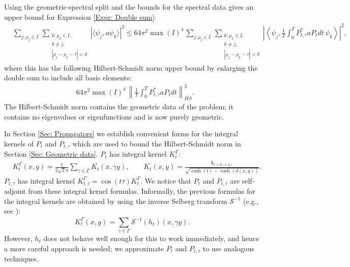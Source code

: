 \documentclass[11pt,twoside,reqno]{amsart} \usepackage{a4wide} \usepackage[T1]{fontenc} \usepackage[utf8]{inputenc} \usepackage{soul}  \usepackage{amsmath} \usepackage{amsfonts} \usepackage{amssymb} \usepackage{mathtools} \usepackage{amsthm} \usepackage{xcolor} \usepackage{graphicx} \usepackage{hyperref} \usepackage{standalone} \usepackage{esint} \usepackage{comment} \usepackage[left=2.3cm,top=3cm,right=2.3cm]{geometry} \usepackage{bm} \usepackage{svg} \usepackage{float} \numberwithin{equation}{section} \theoremstyle{plain} \newtheorem{thm}{Theorem}[section] \newtheorem{theorem}[thm]{Theorem} \newtheorem*{theorem*}{Theorem}\newtheorem{conj}[thm]{Conjecture} \newtheorem{lemma}[thm]{Lemma} \newtheorem{prop}[thm]{Proposition} \newtheorem{proposition}[thm]{Proposition} \newtheorem{cor}[thm]{Corollary} \newtheorem{question}[thm]{Question} \newtheorem{corollary}[thm]{Corollary} \newtheorem{assumption}[thm]{Assumption} \theoremstyle{definition} \newtheorem{defn}[thm]{Definition} \newtheorem{choice}[thm]{Choice} \newtheorem{definition}[thm]{Definition} \newtheorem{ex}[thm]{Example} \newtheorem{notation}[thm]{Notation} \newtheorem*{ack}{Acknowledgements} \theoremstyle{remark} \newtheorem{remark}[thm]{Remark} \newtheorem{bigremark}[thm]{Remark} \usepackage{xcolor} \newcommand{\red}[1]{ {\color{Red}#1} } \newcommand{\blue}[1]{ {\color{Blue}#1} } \author{Kai Hippi} \address{Aalto University, Espoo, Finland} \email{kai.hippi@aalto.fi}
\begin{document}
Using the geometric-spectral split and the bounds for the spectral data gives an upper bound for Expression \eqref{Expr: Double sum}:
\begin{align*}
	&
	\sum_{j: \rho_{j} \in I}^{} \, \sum_{ \substack{ k: \rho_{k} \in I, \\ k \neq j, \\ | \rho_{j} - \rho_{k} - \tau | < \delta } }^{} \left| \langle \psi_{j}, a \psi_{k} \rangle \right|^{2}
\leq
	64 \pi^{2} \max( I )^{4}  \,  \sum_{j: \rho_{j} \in I}^{} \, \sum_{ \substack{ k: \rho_{k} \in I, \\ k \neq j, \\ | \rho_{j} - \rho_{k} - \tau | < \delta } }^{} \left| \left \langle \psi_{j}, \frac{1}{T} \int_{0}^{T} P_{t,\tau}^{*} a P_{t} dt \, \psi_{k} \right \rangle \right|^{2} ,
\end{align*}
where this has the following Hilbert-Schmidt norm upper bound by enlarging the double sum to include all basis elements:
\begin{align*}
	&
	64 \pi^{2} \max( I )^{4} \, \left \| \frac{1}{T} \int_{0}^{T} P_{t,\tau}^{*} a P_{t} dt \right \|_{HS}^{2}.
\end{align*}
The Hilbert-Schmidt norm contains the geometric data of the problem; it contains no eigenvalues or eigenfunctions and is now purely geometric.

In Section \ref{Sec: Propagators} we 
establish convenient forms for the integral kernels of $ P_{t} $ and $ P_{t,\tau} $ which are used to bound the Hilbert-Schmidt norm in Section \ref{Sec: Geometric data}. $ P_{t} $ has integral kernel $ K_{t}^{\Gamma} $:
\begin{align*}
	&
	K_{t}^{\Gamma}( x,y ) = \frac{1}{2 \sqrt{2} \pi} \sum_{\gamma \in \Gamma}^{} K_{t}( x, \gamma y ), \qquad K_{t}( x,y ) = \frac{\boldsymbol 1_{t > d( x,y )}}{\sqrt{ \cosh( t ) - \cosh( d( x,y ) ) }}.
\end{align*}
$ P_{t,\tau} $ has integral kernel $ K_{t,\tau}^{\Gamma} = \cos( t \tau ) K_{t}^{\Gamma} $. We notice that $ P_{t} $ and $ P_{t,\tau} $ are self-adjoint from these integral kernel formulas. Informally, the previous formulas for the integral kernels are obtained by using the inverse Selberg transform $ \mathcal{S}^{-1} $ (e.g., see \cite{LS17}): 
$$ K_{t}^{\Gamma}( x,y ) = \sum_{\gamma \in \Gamma}^{} \mathcal{S}^{-1}( h_{t} )( x, \gamma y ).$$
However, $ h_t $ does not behave well enough for this to work immediately, and hence a more careful approach is needed; we approximate $ P_{t} $ and $ P_{t,\tau} $ to use analogous techniques. 
\end{document}
